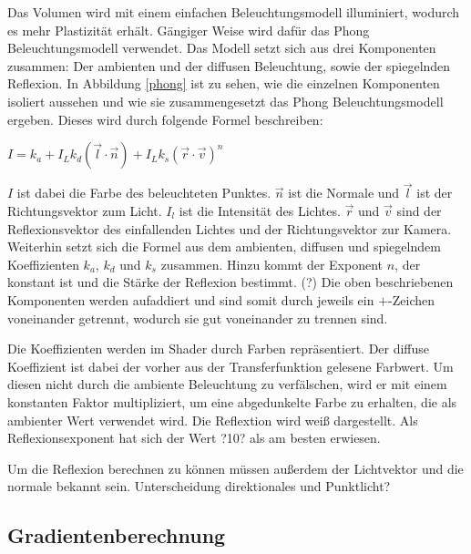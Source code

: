 Das Volumen wird mit einem einfachen Beleuchtungsmodell illuminiert, wodurch es mehr Plastizität erhält. Gängiger Weise wird dafür das Phong Beleuchtungsmodell verwendet. 
Das Modell setzt sich aus drei Komponenten zusammen: Der ambienten und der diffusen Beleuchtung, sowie der spiegelnden Reflexion. In Abbildung \ref{phong} ist zu sehen, wie die einzelnen Komponenten isoliert aussehen und wie sie zusammengesetzt das Phong Beleuchtungsmodell ergeben.
Dieses wird durch folgende Formel beschreiben:

$I = k_{a}+I_{L}k_{d}(\vec{l}\cdot\vec{n})+I_{L}k_{s}(\vec{r}\cdot\vec{v})^n$

$I$ ist dabei die Farbe des beleuchteten Punktes. $\vec{n}$ ist die Normale und $\vec{l}$ ist der Richtungsvektor zum Licht. $I_{l}$ ist die Intensität des Lichtes. $\vec{r}$ und $\vec{v}$ sind der Reflexionsvektor des einfallenden Lichtes und der Richtungsvektor zur Kamera. Weiterhin setzt sich die Formel aus dem ambienten, diffusen und spiegelndem Koeffizienten $k_{a}$, $k_{d}$ und $k_{s}$ zusammen. Hinzu kommt der Exponent $n$, der konstant ist und die Stärke der Reflexion bestimmt. (?)
Die oben beschriebenen Komponenten werden aufaddiert und sind somit durch jeweils ein $+$-Zeichen voneinander getrennt, wodurch sie gut voneinander zu trennen sind. 

Die Koeffizienten werden im Shader durch Farben repräsentiert. Der diffuse Koeffizient ist dabei der vorher aus der Transferfunktion gelesene Farbwert. Um diesen nicht durch die ambiente Beleuchtung zu verfälschen, wird er mit einem konstanten Faktor multipliziert, um eine abgedunkelte Farbe zu erhalten, die als ambienter Wert verwendet wird. Die Reflextion wird weiß dargestellt.
Als Reflexionsexponent hat sich der Wert ?10? als am besten erwiesen.

Um die Reflexion berechnen zu können müssen außerdem der Lichtvektor und die normale bekannt sein.
Unterscheidung direktionales und Punktlicht?

\subsection{Gradientenberechnung}
\label{gradienten}